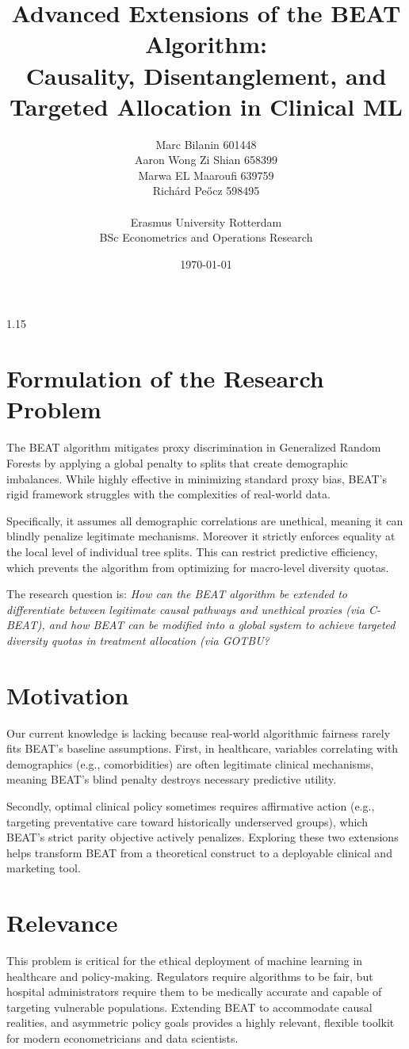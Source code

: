 \documentclass[11pt, a4paper]{article}
\title{\textbf{Advanced Extensions of the BEAT Algorithm: \\ Causality, Disentanglement, and Targeted Allocation in Clinical ML}}
\author{Marc Bilanin 601448 \\ Aaron Wong Zi Shian 658399 \\ Marwa EL Maaroufi 639759\\ Richárd Peőcz 598495 \\\\ Erasmus University Rotterdam \\ BSc Econometrics and Operations Research}
\date{\today}
\begin{document}
\begin{spacing}{1.15}
\maketitle

\section{Formulation of the Research Problem}
The BEAT algorithm \cite{ascarza2022eliminating} mitigates proxy discrimination in Generalized Random Forests by applying a global penalty to splits that create demographic imbalances. While highly effective in minimizing standard proxy bias, BEAT's rigid framework struggles with the complexities of real-world data. 

Specifically, it assumes all demographic correlations are unethical, meaning it can blindly penalize legitimate mechanisms. Moreover it strictly enforces equality at the local level of individual tree splits. This can restrict predictive efficiency, which prevents the algorithm from optimizing for macro-level diversity quotas. 

The research question is: \textit{How can the BEAT algorithm be extended to differentiate between legitimate causal pathways and unethical proxies (via C-BEAT), and how BEAT can be modified into a global system to achieve targeted diversity quotas in treatment allocation (via GOTBU?}

\section{Motivation}
Our current knowledge is lacking because real-world algorithmic fairness rarely fits BEAT's baseline assumptions. First, in healthcare, variables correlating with demographics (e.g., comorbidities) are often legitimate clinical mechanisms, meaning BEAT's blind penalty destroys necessary predictive utility. 

Secondly, optimal clinical policy sometimes requires affirmative action (e.g., targeting preventative care toward historically underserved groups), which BEAT's strict parity objective actively penalizes. Exploring these two extensions helps transform BEAT from a theoretical construct to a deployable clinical and marketing tool.

\section{Relevance}
This problem is critical for the ethical deployment of machine learning in healthcare and policy-making. Regulators require algorithms to be fair, but hospital administrators require them to be medically accurate and capable of targeting vulnerable populations. Extending BEAT to accommodate causal realities, and asymmetric policy goals provides a highly relevant, flexible toolkit for modern econometricians and data scientists.



\end{spacing}
\end{document}
